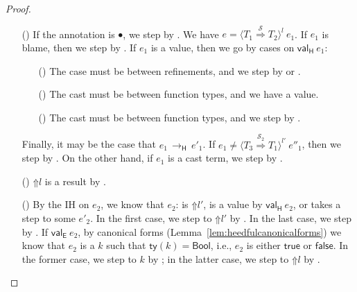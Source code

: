 \documentclass[9pt]{extarticle}
\newcommand{\ottnt}[1]{\mathit{#1}}
\newcommand{\ottsym}[1]{#1}
\begin{document}
{\begin{lemma}
\begin{proof}
{\begin{itemize}
    \item[(\T{Cast})] If the annotation is $ \bullet $, we step by
      . We have $\ottnt{e}  \ottsym{=}   \langle  \ottnt{T_{{\mathrm{1}}}}  \mathord{ \overset{ \mathcal{S} }{\Rightarrow} }  \ottnt{T_{{\mathrm{2}}}}  \rangle^{ \ottnt{l} } ~  \ottnt{e_{{\mathrm{1}}}} $. If $\ottnt{e_{{\mathrm{1}}}}$ is
      blame, then we step by .
If $\ottnt{e_{{\mathrm{1}}}}$ is a value, then we go by cases on $ \mathsf{val} _{  \mathsf{H}  }~ \ottnt{e_{{\mathrm{1}}}} $:
\begin{itemize}
      \item[(\V{Const})] The case must be between refinements, and we
        step by  or .
      \item[(\V{Abs})] The cast must be between function types, and we have a value.
      \item[(\V{ProxyH})] The cast must be between function types, and
        we step by .
      \end{itemize}
Finally, it may be the case that $\ottnt{e_{{\mathrm{1}}}} \,  \longrightarrow _{  \mathsf{H}  }  \, \ottnt{e'_{{\mathrm{1}}}}$.
If $\ottnt{e_{{\mathrm{1}}}}  \neq   \langle  \ottnt{T_{{\mathrm{3}}}}  \mathord{ \overset{ \mathcal{S}_{{\mathrm{2}}} }{\Rightarrow} }  \ottnt{T_{{\mathrm{1}}}}  \rangle^{ \ottnt{l'} } ~  \ottnt{e''_{{\mathrm{1}}}} $, then we step by .
On the other hand, if $\ottnt{e_{{\mathrm{1}}}}$ is a cast term, we step by
      .

    \item[(\T{Blame})] $ \mathord{\Uparrow}  \ottnt{l} $ is a result by .

    \item[(\T{Check})] By the IH on $\ottnt{e_{{\mathrm{2}}}}$, we know that $\ottnt{e_{{\mathrm{2}}}}$:
      is $ \mathord{\Uparrow}  \ottnt{l'} $, is a value by $ \mathsf{val} _{  \mathsf{H}  }~ \ottnt{e_{{\mathrm{2}}}} $, or takes a
      step to some $\ottnt{e'_{{\mathrm{2}}}}$. In the first case, we step to
      $ \mathord{\Uparrow}  \ottnt{l'} $ by . In the last case, we step by
      . If $ \mathsf{val} _{  \mathsf{E}  }~ \ottnt{e_{{\mathrm{2}}}} $, by canonical forms
      (Lemma~\ref{lem:heedfulcanonicalforms}) we know that $\ottnt{e_{{\mathrm{2}}}}$ is
      a $\ottnt{k}$ such that $ \mathsf{ty} ( \ottnt{k} )   \ottsym{=}   \mathsf{Bool} $, i.e., $\ottnt{e_{{\mathrm{2}}}}$ is either
      $ \mathsf{true} $ or $ \mathsf{false} $. In the former case, we step to
      $\ottnt{k}$ by ; in the latter case, we step to
      $ \mathord{\Uparrow}  \ottnt{l} $ by .
    \end{itemize}
    \fi}
  \end{proof}
\end{lemma}

}
\end{document}
